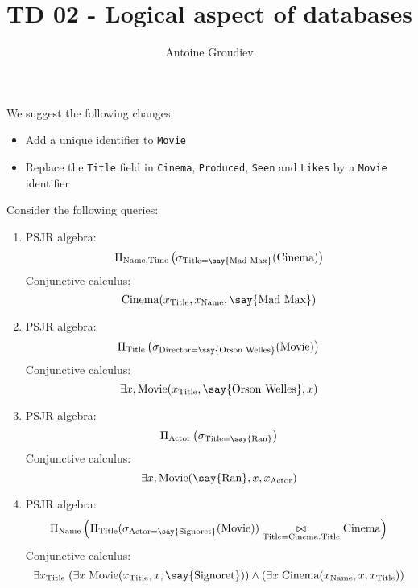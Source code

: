 \documentclass{../../cs-classes/cs-classes}
\title{TD 02 - Logical aspect of databases}
\author{Antoine Groudiev}
\newcommand*{\cinema}{\textnormal{Cinema}}
\newcommand*{\titl}{\textnormal{Title}}
\newcommand*{\movie}{\textnormal{Movie}}
\newcommand*{\name}{\textnormal{Name}}
\newcommand*{\tim}{\textnormal{Time}}
\newcommand*{\actor}{\textnormal{Actor}}
\newcommand*{\director}{\textnormal{Director}}
\newcommand{\constant}[1]{\textnormal{\say{#1}}}
\begin{document}
\begin{exercise}
    We suggest the following changes:
    \begin{itemize}
        \item Add a unique identifier to \texttt{Movie}
        \item Replace the \texttt{Title} field in \texttt{Cinema}, \texttt{Produced}, \texttt{Seen} and \texttt{Likes} by a \texttt{Movie} identifier
    \end{itemize}
\end{exercise}

\begin{exercise}
    Consider the following queries:
    \begin{enumerate}
        \item PSJR algebra:
        \begin{equation*}
            \Pi_{\name, \tim}\left(\sigma_{\titl=\constant{Mad Max}}(\cinema)\right)
        \end{equation*}
        Conjunctive calculus:
        \begin{equation*}
            \cinema(x_{\titl}, x_{\name}, \constant{Mad Max})
        \end{equation*}

        \item PSJR algebra:
        \begin{equation*}
            \Pi_{\titl}\left(\sigma_{\director =\constant{Orson Welles}}(\movie)\right)
        \end{equation*}
        Conjunctive calculus:
        \begin{equation*}
            \exists x, \movie(x_{\titl}, \constant{Orson Welles}, x)
        \end{equation*}

        \item PSJR algebra:
        \begin{equation*}
            \Pi_{\actor}\left(\sigma_{\titl=\constant{Ran}}\right)
        \end{equation*}
        Conjunctive calculus:
        \begin{equation*}
            \exists x, \movie(\constant{Ran}, x, x_{\actor})
        \end{equation*}

        \item PSJR algebra:
        \begin{equation*}
            \Pi_{\name}\left(\Pi_{\titl}(\sigma_{\actor=\constant{Signoret}}(\movie))\underset{\titl=\cinema.\titl}{\bowtie}\cinema\right)
        \end{equation*}
        Conjunctive calculus:
        \begin{equation*}
            \exists x_{\titl} \;(\exists x \;\movie(x_{\titl}, x, \constant{Signoret})) \land (\exists x \; \cinema(x_{\name}, x, x_{\titl}))
        \end{equation*}


\end{enumerate}
\end{exercise}
\end{document}
